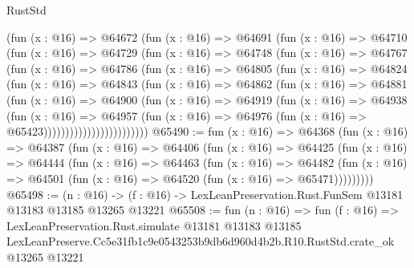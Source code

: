\begin{lexlean}{RustStd}
\begin{coremodule}
                (fun (x : @16) =>
                @64672
                  (fun (x : @16) =>
                  @64691
                    (fun (x : @16) =>
                    @64710
                      (fun (x : @16) =>
                      @64729
                        (fun (x : @16) =>
                        @64748
                          (fun (x : @16) =>
                          @64767
                            (fun (x : @16) =>
                            @64786
                              (fun (x : @16) =>
                              @64805
                                (fun (x : @16) =>
                                @64824
                                  (fun (x : @16) =>
                                  @64843
                                    (fun (x : @16) =>
                                    @64862
                                      (fun (x : @16) =>
                                      @64881
                                        (fun (x : @16) =>
                                        @64900
                                          (fun (x : @16) =>
                                          @64919
                                            (fun (x : @16) =>
                                            @64938
                                              (fun (x : @16) =>
                                              @64957
                                                (fun (x : @16) =>
                                                @64976
                                                  (fun (x : @16) => @65423))))))))))))))))))))))))
@65490 := fun (x : @16) =>
  @64368
    (fun (x : @16) =>
    @64387
      (fun (x : @16) =>
      @64406
        (fun (x : @16) =>
        @64425
          (fun (x : @16) =>
          @64444
            (fun (x : @16) =>
            @64463
              (fun (x : @16) =>
              @64482
                (fun (x : @16) => @64501 (fun (x : @16) => @64520 (fun (x : @16) => @65471)))))))))
@65498 := (n : @16) ->
  (f : @16) -> LexLeanPreservation.Rust.FunSem @13181 @13183 @13185 @13265 @13221
@65508 := fun (n : @16) =>
  fun (f : @16) =>
  LexLeanPreservation.Rust.simulate
    @13181
    @13183
    @13185
    LexLeanPreserve.Cc5e31fb1c9e0543253b9db6d960d4b2b.R10.RustStd.crate_ok
    @13265
    @13221
\end{coremodule}
\end{lexlean}
